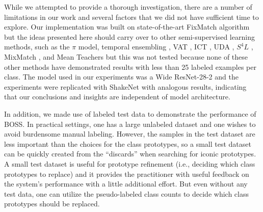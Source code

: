 \documentclass[final]{cvpr}
\newcommand{\SOTA}{state-of-the-art }
\newcommand{\SSL}{semi-supervised learning }
\begin{document}
While we attempted to provide a thorough investigation, there are a number of limitations in our work and several factors that we did not have sufficient time to explore.
Our implementation was built on \SOTA FixMatch algorithm but the ideas presented here should carry over to other \SSL methods, such as the $\pi$ model, temporal ensembling \cite{laine2016temporal}, VAT \cite{miyato2018virtual}, ICT \cite{verma2019interpolation}, UDA \cite{xie2019unsupervised}, $S^4L$ \cite{zhai2019s4l}, MixMatch \cite{berthelot2019mixmatch}, and Mean Teachers \cite{tarvainen2017mean} but this was not tested because none of these other methods  have demonstrated results with less than 25 labeled examples per class.  
The model used in our experiments was a Wide ResNet-28-2 and the experiments were replicated with ShakeNet \cite{gastaldi2017shake} with analogous results, indicating that our conclusions and insights are independent of model architecture.


In addition, we made use of labeled test data to demonstrate the performance of BOSS.
In practical settings, one has a large unlabeled dataset and one wishes to avoid burdensome manual labeling.
However, the samples in the test dataset are less important than the choices for the class prototypes, so a small test dataset can be quickly created from the ``discards'' when searching for iconic prototypes.
A small test dataset is useful for prototype refinement (i.e., deciding which class prototypes to replace) and it provides the practitioner with useful feedback on the system's performance with a little additional effort.
But even without any test data, one can utilize the pseudo-labeled class counts to decide which class prototypes  should be replaced.
\end{document}
